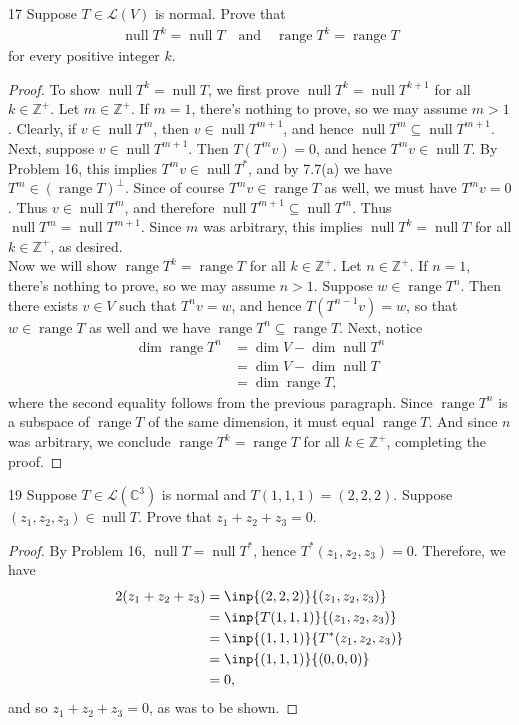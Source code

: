 \documentclass{extarticle}
\newenvironment{problem}[1]{\begin{prob*}{#1}{}}{\end{prob*}}
\newcommand{\Z}{\mathbb{Z}}
\newcommand{\C}{\mathbb{C}}
\newcommand{\Hom}{\mathcal{L}}
\DeclareMathOperator{\Null}{null}
\DeclareMathOperator{\Range}{range}
\begin{document}
\begin{problem}{17}
Suppose $T\in\Hom(V)$ is normal.  Prove that
\begin{align*}
\Null T^k = \Null T \quad \text{and} \quad \Range T^k = \Range T
\end{align*}
for every positive integer $k$.
\end{problem}
\begin{proof}
To show $\Null T^k = \Null T$, we first prove $\Null T^k = \Null T^{k + 1}$ for all $k\in\Z^+$.  Let $m\in\Z^+$.  If $m = 1$, there's nothing to prove, so we may assume $m > 1$.  Clearly, if $v\in\Null T^m$, then $v\in\Null T^{m+1}$, and hence $\Null T^m \subseteq\Null T^{m+1}$.  Next, suppose $v\in\Null T^{m + 1}$.  Then $T(T^m v)=0$, and hence $T^mv\in\Null T$.  By Problem 16, this implies $T^mv\in\Null T^\ast$, and by 7.7(a) we have $T^m\in(\Range T)^\perp$.  Since of course $T^mv\in\Range T$ as well, we must have $T^mv = 0$.  Thus $v \in \Null T^m$, and therefore $\Null T^{m+1} \subseteq \Null T^m$.  Thus $\Null T^m = \Null T^{m + 1}$.  Since $m$ was arbitrary, this implies $\Null T^k = \Null T$ for all $k\in\Z^+$, as desired.\\
\indent Now we will show $\Range T^k = \Range T$ for all $k\in\Z^+$.  Let $n\in\Z^+$.  If $n=1$, there's nothing to prove, so we may assume $n>1$.  Suppose $w\in \Range T^{n}$.  Then there exists $v\in V$ such that $T^nv = w$, and hence $T(T^{n-1}v) = w$, so that $w\in\Range T$ as well and we have $\Range T^n\subseteq \Range T$.  Next, notice 
\begin{align*}
\dim \Range T^n &= \dim V - \dim \Null T^n\\
&= \dim V - \dim\Null T\\
&= \dim \Range T,
\end{align*}
where the second equality follows from the previous paragraph.  Since $\Range T^n$ is a subspace of $\Range T$ of the same dimension, it must equal $\Range T$.  And since $n$ was arbitrary, we conclude $\Range T^k = \Range T$ for all $k\in\Z^+$, completing the proof.
\end{proof}

\begin{problem}{19}
Suppose $T\in\Hom(\C^3)$ is normal and $T(1, 1, 1) = (2, 2, 2)$.  Suppose $(z_1,z_2,z_3)\in\Null T$.  Prove that $z_1 + z_2 + z_3 = 0$.
\end{problem}
\begin{proof}
By Problem 16, $\Null T = \Null T^\ast$, hence $T^\ast(z_1, z_2, z_3) = 0$.  Therefore, we have
\begin{align*}
2(z_1 + z_2 + z_3) &= \inp{(2, 2, 2)}{(z_1, z_2, z_3)}\\
&= \inp{T(1, 1, 1)}{(z_1, z_2, z_3)} \\
&= \inp{(1, 1, 1)}{T^\ast(z_1, z_2, z_3)}\\
&= \inp{(1, 1, 1)}{(0, 0, 0)}\\
&= 0,
\end{align*}
and so $z_1 + z_2 + z_3 = 0$, as was to be shown. 
\end{proof}
\end{document}
